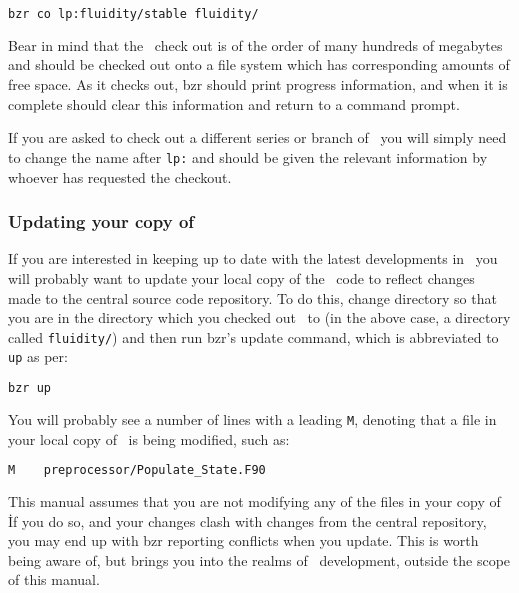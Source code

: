 \begin{lstlisting}[language=Bash]
bzr co lp:fluidity/stable fluidity/
\end{lstlisting}

Bear in mind that the \fluidity\ check out is of the order of many hundreds of
megabytes and should be checked out onto a file system which has corresponding
amounts of free space. As it checks out, bzr should print progress information,
and when it is complete should clear this information and return to a command
prompt.

If you are asked to check out a different series or branch of \fluidity\ you
will simply need to change the name after \lstinline[language=Bash]+lp:+ and
should be given the relevant information by whoever has requested the checkout.

\subsubsection{Updating your copy of \fluidity}
\label{sec:subversion_updating}

If you are interested in keeping up to date with the latest developments in
\fluidity\ you will probably want to update your local copy of the \fluidity\
code to reflect changes made to the central source code repository. To do this,
change directory so that you are in the directory which you checked out
\fluidity\ to (in the above case, a directory called
\lstinline[language=Bash]+fluidity/+) and then run bzr's update command, which
is abbreviated to \lstinline[language=Bash]+up+ as per:

\begin{lstlisting}[language=Bash]
bzr up
\end{lstlisting}

You will probably see a number of lines with a leading
\lstinline[language=Bash]+M+, denoting that a file in your local copy of
\fluidity\ is being modified, such as:

\begin{lstlisting}[language=Bash]
M    preprocessor/Populate_State.F90
\end{lstlisting}

This manual assumes that you are not modifying any of the files in your copy of
\fluidity\. If you do so, and your changes clash with changes from the central
repository, you may end up with bzr reporting conflicts when you update. This
is worth being aware of, but brings you into the realms of \fluidity\
development, outside the scope of this manual.

